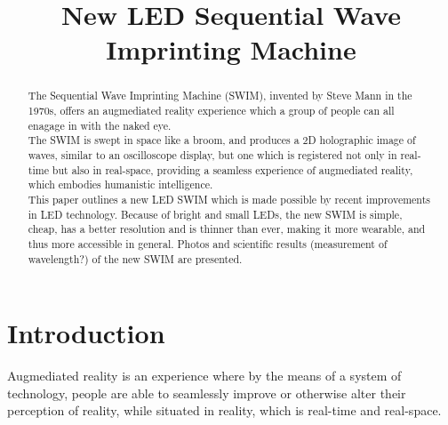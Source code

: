 \documentclass[conference]{IEEEtran}
\begin{document}
\title{New LED Sequential Wave Imprinting Machine}


\author{%
}
\maketitle


\begin{abstract}

The Sequential Wave Imprinting Machine (SWIM), invented by Steve Mann in the 1970s, offers an augmediated reality experience which a group of people can all enagage in with the naked eye.\\
The SWIM is swept in space like a broom, and produces a 2D holographic image of waves, similar to an oscilloscope display, but one which is registered not only in real-time but also in real-space, providing a seamless experience of augmediated reality, which embodies humanistic intelligence. \\
This paper outlines a new LED SWIM which is made possible by recent improvements in LED technology. Because of bright and small LEDs, the new SWIM is simple, cheap, has a better resolution and is thinner than ever, making it more wearable, and thus more accessible in general. Photos and scientific results (measurement of wavelength?) of the new SWIM are presented.\\

\end{abstract}

%

\IEEEpeerreviewmaketitle

\section{Introduction}
Augmediated reality is an experience where by the means of a system of technology, people are able to seamlessly improve or otherwise alter their perception of reality, while situated in reality, which is real-time and real-space. \\
\end{document}
